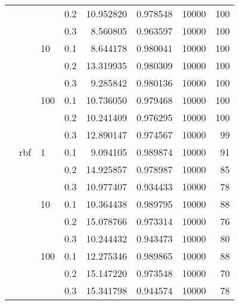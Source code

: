 \begin{table}[H]
\begin{tabular}{llllrrrr}
           &     &     & 0.2 &  10.952820 &  0.978548 &   10000 &   100 \\
           &     &     & 0.3 &   8.560805 &  0.963597 &   10000 &   100 \\
           &     & 10  & 0.1 &   8.644178 &  0.980041 &   10000 &   100 \\
           &     &     & 0.2 &  13.319935 &  0.980309 &   10000 &   100 \\
           &     &     & 0.3 &   9.285842 &  0.980136 &   10000 &   100 \\
           &     & 100 & 0.1 &  10.736050 &  0.979468 &   10000 &   100 \\
           &     &     & 0.2 &  10.241409 &  0.976295 &   10000 &   100 \\
           &     &     & 0.3 &  12.890147 &  0.974567 &   10000 &    99 \\
           & rbf & 1   & 0.1 &   9.094105 &  0.989874 &   10000 &    91 \\
           &     &     & 0.2 &  14.925857 &  0.978987 &   10000 &    85 \\
           &     &     & 0.3 &  10.977407 &  0.934433 &   10000 &    78 \\
           &     & 10  & 0.1 &  10.364438 &  0.989795 &   10000 &    88 \\
           &     &     & 0.2 &  15.078766 &  0.973314 &   10000 &    76 \\
           &     &     & 0.3 &  10.244432 &  0.943473 &   10000 &    80 \\
           &     & 100 & 0.1 &  12.275346 &  0.989865 &   10000 &    88 \\
           &     &     & 0.2 &  15.147220 &  0.973548 &   10000 &    70 \\
           &     &     & 0.3 &  15.341798 &  0.944574 &   10000 &    78 \\
\bottomrule
\end{tabular}
\end{table}
